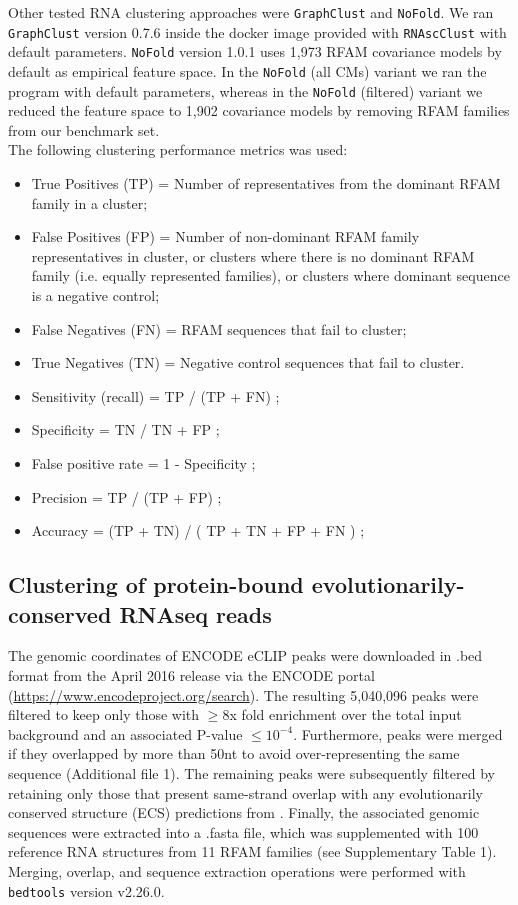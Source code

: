 \documentclass{bmcart}
\newcommand\graphclust{\texttt{GraphClust}}
\newcommand\nofold{\texttt{NoFold}}
\begin{document}
Other tested RNA clustering approaches were \graphclust{} and \nofold. We ran \graphclust{} version 0.7.6 inside the docker image provided with \texttt{RNAscClust} with default parameters. \nofold{} version 1.0.1 uses 1,973 RFAM covariance models by default as empirical feature space. In the \nofold{} (all CMs) variant we ran the program with default parameters, whereas in the \nofold{} (filtered) variant we reduced the feature space to 1,902 covariance models by removing RFAM families from our benchmark set. \\ 

The following clustering performance metrics was used: 
\begin{itemize}
\item True Positives (TP) = Number of representatives from the dominant RFAM family in a cluster;
\item False Positives (FP) = Number of non-dominant RFAM family representatives in cluster, or clusters
where there is no dominant RFAM family (i.e. equally represented families), or clusters where dominant sequence is a negative control;
\item False Negatives (FN) = RFAM sequences that fail to cluster; 
\item True Negatives (TN) = Negative control sequences that fail to cluster. 
\item Sensitivity (recall) = TP  / (TP + FN) ;
\item Specificity  = TN / TN + FP ;
\item False positive rate =  1 - Specificity ;
\item Precision = TP / (TP + FP) ;
\item Accuracy = (TP + TN) / ( TP + TN + FP + FN )  ; 
\end{itemize}


\subsection*{Clustering of protein-bound evolutionarily-conserved RNAseq reads}

The genomic coordinates of ENCODE eCLIP peaks were downloaded in .bed format from the April 2016 release via the ENCODE portal (\url{https://www.encodeproject.org/search}). The resulting 5,040,096 peaks 
were filtered to keep only those with $\ge$8x fold enrichment over the total input background and an associated P-value  $\leq10^{-4}$. Furthermore, peaks were merged if they overlapped by more than 50nt to avoid over-representing the same sequence (Additional file 1). The remaining peaks were subsequently filtered by 
retaining only those that present same-strand overlap with any evolutionarily conserved structure (ECS) predictions from \cite{smith2013widespread}. Finally, the associated genomic sequences were extracted into a .fasta file, which was supplemented with 100 reference RNA structures from 11 RFAM families (see Supplementary Table 1). 
Merging, overlap, and sequence extraction operations were performed with \texttt{bedtools} version v2.26.0. \\
\end{document}
